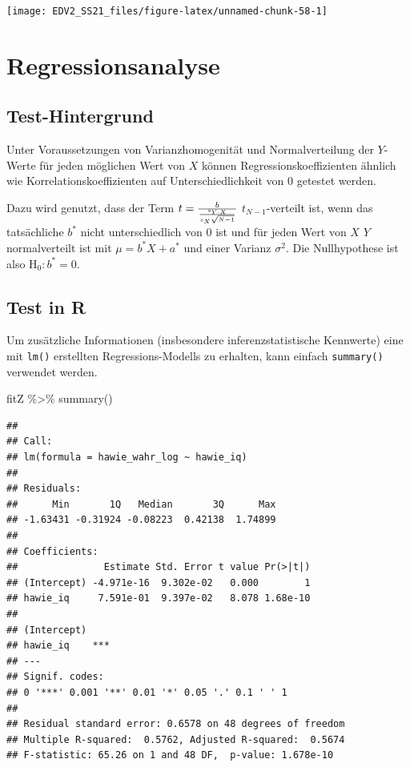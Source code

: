 \documentclass[
]{book}
\newenvironment{Shaded}{\begin{snugshade}}{\end{snugshade}}
\newcommand{\FunctionTok}[1]{\textcolor[rgb]{0.00,0.00,0.00}{#1}}
\newcommand{\NormalTok}[1]{#1}
\newcommand{\SpecialCharTok}[1]{\textcolor[rgb]{0.00,0.00,0.00}{#1}}
\begin{document}
\begin{center}\texttt{[image: EDV2\_SS21\_files/figure-latex/unnamed-chunk-58-1]} \end{center}

\hypertarget{regressionsanalyse}{%
\section{Regressionsanalyse}\label{regressionsanalyse}}

\hypertarget{test-hintergrund-1}{%
\subsection{Test-Hintergrund}\label{test-hintergrund-1}}

Unter Voraussetzungen von Varianzhomogenität und Normalverteilung der \(Y\)-Werte für jeden möglichen Wert von \(X\) können Regressionskoeffizienten ähnlich wie Korrelationskoeffizienten auf Unterschiedlichkeit von 0 getestet werden.

Dazu wird genutzt, dass der Term \(t = {{b}\over{{s_{Y \cdot X}}\over {s_X \sqrt{N-1}}}}\) \(t_{N-1}\)-verteilt ist, wenn das tatsächliche \(b^*\) nicht unterschiedlich von 0 ist und für jeden Wert von \(X\) \(Y\) normalverteilt ist mit \(\mu = b^*X + a^*\) und einer Varianz \(\sigma^2\). Die Nullhypothese ist also \(\text{H}_0: b^* = 0\).

\hypertarget{test-in-r}{%
\subsection{Test in R}\label{test-in-r}}

Um zusätzliche Informationen (insbesondere inferenzstatistische Kennwerte) eine mit \texttt{lm()} erstellten Regressions-Modells zu erhalten, kann einfach \texttt{summary()} verwendet werden.

\begin{Shaded}
\begin{Highlighting}[]
\NormalTok{fitZ }\SpecialCharTok{\%\textgreater{}\%} 
  \FunctionTok{summary}\NormalTok{()}
\end{Highlighting}
\end{Shaded}

\begin{verbatim}
## 
## Call:
## lm(formula = hawie_wahr_log ~ hawie_iq)
## 
## Residuals:
##      Min       1Q   Median       3Q      Max 
## -1.63431 -0.31924 -0.08223  0.42138  1.74899 
## 
## Coefficients:
##               Estimate Std. Error t value Pr(>|t|)
## (Intercept) -4.971e-16  9.302e-02   0.000        1
## hawie_iq     7.591e-01  9.397e-02   8.078 1.68e-10
##                
## (Intercept)    
## hawie_iq    ***
## ---
## Signif. codes:  
## 0 '***' 0.001 '**' 0.01 '*' 0.05 '.' 0.1 ' ' 1
## 
## Residual standard error: 0.6578 on 48 degrees of freedom
## Multiple R-squared:  0.5762, Adjusted R-squared:  0.5674 
## F-statistic: 65.26 on 1 and 48 DF,  p-value: 1.678e-10
\end{verbatim}
\end{document}
